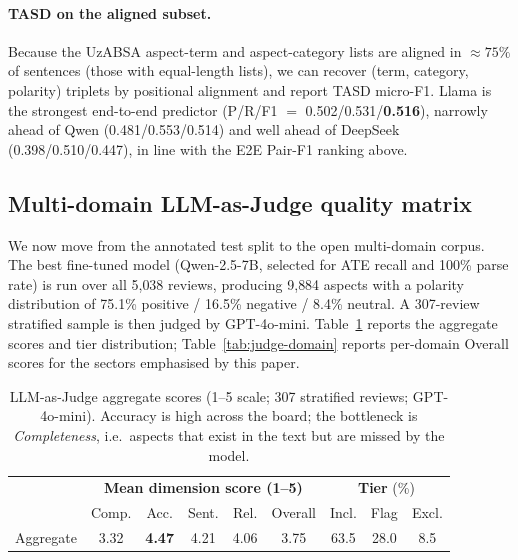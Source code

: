\documentclass[runningheads]{llncs}
\begin{document}
\paragraph{TASD on the aligned subset.}
Because the UzABSA aspect-term and aspect-category lists are aligned in
$\approx 75\%$ of sentences (those with equal-length lists), we can
recover (term, category, polarity) triplets by positional alignment and
report TASD micro-F1. Llama is the strongest end-to-end predictor
(P/R/F1 $=$ 0.502/0.531/\textbf{0.516}), narrowly ahead of Qwen
(0.481/0.553/0.514) and well ahead of DeepSeek (0.398/0.510/0.447), in
line with the E2E Pair-F1 ranking above.

\subsection{Multi-domain LLM-as-Judge quality matrix}
\label{sec:results:judge}

We now move from the annotated test split to the open multi-domain
corpus. The best fine-tuned model (Qwen-2.5-7B, selected for ATE
recall and 100\% parse rate) is run over all 5{,}038 reviews,
producing 9{,}884 aspects with a polarity distribution of 75.1\%
positive / 16.5\% negative / 8.4\% neutral. A 307-review stratified
sample is then judged by GPT-4o-mini. Table~\ref{tab:judge-agg}
reports the aggregate scores and tier distribution;
Table~\ref{tab:judge-domain} reports per-domain Overall scores for the
sectors emphasised by this paper.

\begin{table}[!htbp]
\centering
\caption{LLM-as-Judge aggregate scores (1--5 scale; 307 stratified
reviews; GPT-4o-mini). Accuracy is high across the board; the
bottleneck is \emph{Completeness}, i.e.\ aspects that exist in the text
but are missed by the model.}
\label{tab:judge-agg}
\renewcommand{\arraystretch}{1.1}
\setlength{\tabcolsep}{8pt}
\begin{tabular}{lccccc|ccc}
\toprule
& \multicolumn{5}{c|}{\textbf{Mean dimension score (1--5)}} & \multicolumn{3}{c}{\textbf{Tier} (\%)} \\
& Comp. & Acc. & Sent. & Rel. & Overall & Incl. & Flag & Excl. \\
\midrule
Aggregate & 3.32 & \textbf{4.47} & 4.21 & 4.06 & 3.75 & 63.5 & 28.0 & 8.5 \\
\bottomrule
\end{tabular}
\end{table}
\end{document}
